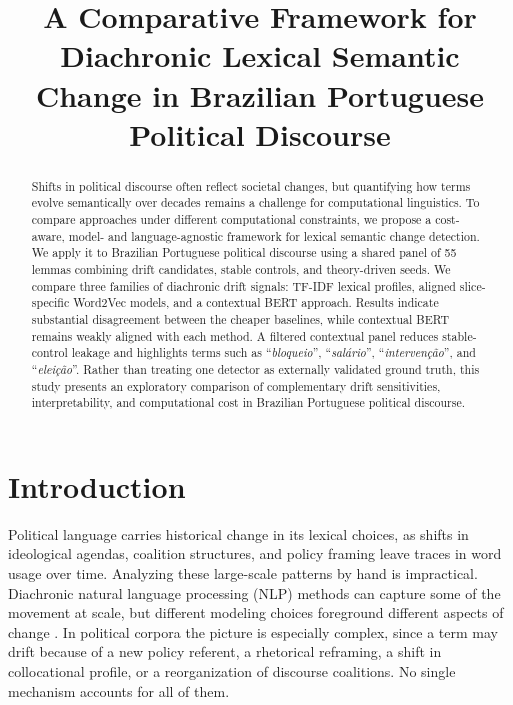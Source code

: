 \documentclass[12pt]{article}
\title{A Comparative Framework for Diachronic Lexical Semantic Change in Brazilian Portuguese Political Discourse}
\author{}
\begin{document}
\maketitle

\begin{abstract}
Shifts in political discourse often reflect societal changes, but quantifying how terms evolve semantically over decades remains a challenge for computational linguistics. To compare approaches under different computational constraints, we propose a cost-aware, model- and language-agnostic framework for lexical semantic change detection. 
We apply it to Brazilian Portuguese political discourse using a shared panel of 55 lemmas combining drift candidates, stable controls, and theory-driven seeds. We compare three families of diachronic drift signals: TF-IDF lexical profiles, aligned slice-specific Word2Vec models, and a contextual BERT approach.
%
Results indicate substantial disagreement between the cheaper baselines, while contextual BERT remains weakly aligned with each method. A filtered contextual panel reduces stable-control leakage and
highlights terms such as ``\textit{bloqueio}'', ``\textit{sal\'ario}'',
``\textit{interven\c{c}\~ao}'', and ``\textit{elei\c{c}\~ao}''. Rather than treating
one detector as externally validated ground truth, this study presents an
exploratory comparison of complementary drift sensitivities, interpretability,
and computational cost in Brazilian Portuguese political discourse. %
\end{abstract}

\section{Introduction}
\label{sec:introduction}

Political language carries historical change in its lexical choices, as shifts in ideological agendas, coalition structures, and policy framing leave traces in word usage over time. Analyzing these large-scale patterns by hand is impractical. Diachronic natural language processing (NLP) methods can capture some of the movement at scale, but different modeling choices foreground different aspects of change
\cite{hamilton-etal-2016-diachronic,kutuzov-etal-2018-diachronic,tahmasebi-etal-2021-computational}.
In political corpora the picture is especially complex, since a term may drift
because of a new policy referent, a rhetorical reframing, a shift in
collocational profile, or a reorganization of discourse coalitions. No single mechanism accounts for all of them. 
\end{document}
